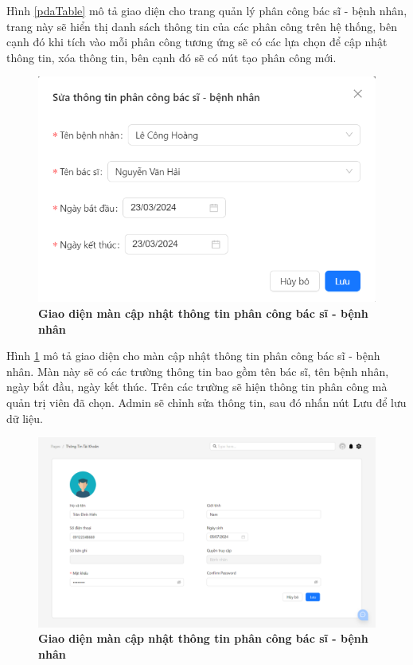 Hình \ref{pdaTable} mô tả giao diện cho trang quản lý phân công bác sĩ - bệnh nhân, trang này sẽ hiển thị danh sách
thông tin của các phân công trên hệ thống, bên cạnh đó khi tích vào mỗi phân công tương ứng sẽ 
có các lựa chọn để cập nhật thông tin, xóa thông tin, bên cạnh đó sẽ có nút tạo phân công mới. 

\begin{figure}[H]
  \centering
  \includegraphics[scale=0.7]{Images/server/webUI/editPDA.png}
  \caption[Giao diện màn cập nhật thông tin phân công bác sĩ - bệnh nhân]{\bfseries \fontsize{12pt}{0pt}\selectfont Giao diện màn cập nhật thông tin phân công bác sĩ - bệnh nhân}
  \label{editPDA} %
\end{figure}

Hình \ref{editPDA} mô tả giao diện cho màn cập nhật thông tin phân công bác sĩ - bệnh nhân. Màn này sẽ có các trường thông tin bao gồm 
tên bác sĩ, tên bệnh nhân, ngày bắt đầu, ngày kết thúc. Trên các trường sẽ hiện thông tin phân công mà quản trị viên đã chọn. 
Admin sẽ chỉnh sửa thông tin, sau đó nhấn nút Lưu để lưu dữ liệu.

\begin{figure}[H]
  \centering
  \includegraphics[scale=0.5]{Images/server/webUI/accountInfo.png}
  \caption[Giao diện trang thông tin tài khoản]{\bfseries \fontsize{12pt}{0pt}\selectfont Giao diện màn cập nhật thông tin phân công bác sĩ - bệnh nhân}
  \label{accountInfo} %
\end{figure}

